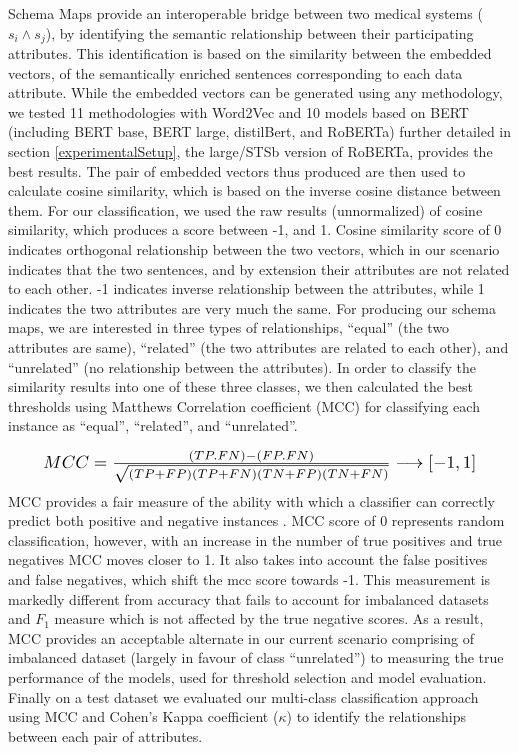 \documentclass{ieeeaccess}
\begin{document}
Schema Maps provide an interoperable bridge between two medical systems ($s_i \wedge s_j$), by identifying the semantic relationship between their participating attributes. This identification is based on the similarity between the embedded vectors, of the semantically enriched sentences corresponding to each data attribute. While the embedded vectors can be generated using any methodology, we tested 11 methodologies with Word2Vec and 10 models based on BERT (including BERT base, BERT large, distilBert, and RoBERTa) further detailed in section \ref{experimentalSetup}, the large/STSb version of RoBERTa\cite{reimers-2019-sentence-bert}, provides the best results. The pair of embedded vectors thus produced are then used to calculate cosine similarity, which is based on the inverse cosine distance between them. For our classification, we used the raw results (unnormalized) of cosine similarity, which produces a score between -1, and 1. Cosine similarity score of 0 indicates orthogonal relationship between the two vectors, which in our scenario indicates that the two sentences, and by extension their attributes are not related to each other. -1 indicates inverse relationship between the attributes, while 1 indicates the two attributes are very much the same.
For producing our schema maps, we are interested in three types of relationships, ``equal'' (the two attributes are same), ``related'' (the two attributes are related to each other), and ``unrelated'' (no relationship between the attributes). In order to classify the similarity results into one of these three classes, we then calculated the best thresholds using Matthews Correlation coefficient (MCC) \cite{chicco2020advantages} for classifying each instance as ``equal'', ``related'', and ``unrelated''. 

\begin{equation}
\resizebox{0.9\hsize}{!}{$%
	MCC = \frac{(TP.FN) - (FP.FN)}{\sqrt{(TP+FP)(TP+FN)(TN+FP)(TN+FN)}}\longrightarrow [-1,1]
	$%
}%
\end{equation}
MCC provides a fair measure of the ability with which a classifier can correctly predict both positive and negative instances \cite{chicco2020advantages}. MCC score of 0 represents random classification, however, with an increase in the number of true positives and true negatives MCC moves closer to 1. It also takes into account the false positives and false negatives, which shift the mcc score towards -1. This measurement is markedly different from accuracy that fails to account for imbalanced datasets and $F_1$ measure which is not affected by the true negative scores. As a result, MCC provides an acceptable alternate in our current scenario comprising of imbalanced dataset (largely in favour of class ``unrelated'') to measuring the true performance of the models, used for threshold selection and model evaluation. Finally on a test dataset we evaluated our multi-class classification approach using MCC and Cohen's Kappa coefficient ($\kappa$) \cite{gwet2014handbook} to identify the relationships between each pair of attributes.
\end{document}

